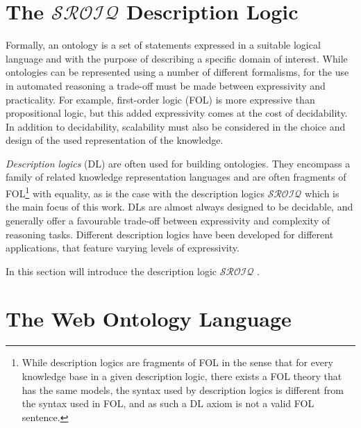 
\section{The \texorpdfstring{$\mathcal{SROIQ}$}{SROIQ} Description Logic} \label{sroiq-def}

Formally, an ontology is a set of statements expressed in a suitable logical language and with the purpose of describing a specific domain of interest. While ontologies can be represented using a number of different formalisms, for the use in automated reasoning a trade-off must be made between expressivity and practicality. For example, first-order logic (FOL) is more expressive than propositional logic, but this added expressivity comes at the cost of decidability. In addition to decidability, scalability must also be considered in the choice and design of the used representation of the knowledge.

\emph{Description logics} (DL) are often used for building ontologies. They encompass a family of related knowledge representation languages and are often fragments of FOL\footnote{While description logics are fragments of FOL in the sense that for every knowledge base in a given description logic, there exists a FOL theory that has the same models, the syntax used by description logics is different from the syntax used in FOL, and as such a DL axiom is not a valid FOL sentence.} with equality, as is the case with the description logics $\mathcal{SROIQ}$ which is the main focus of this work. DLs are almost always designed to be decidable, and generally offer a favourable trade-off between expressivity and complexity of reasoning tasks. Different description logics have been developed for different applications, that feature varying levels of expressivity.

In this section will introduce the description logic $\mathcal{SROIQ}$ \cite{horrocks2006even, rudolph2011foundations, baader_horrocks_lutz_sattler_2017}.



\section{The Web Ontology Language} \label{owl-def}



